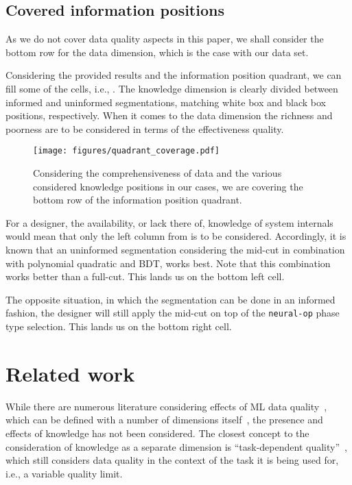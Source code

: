 \subsection{Covered information positions}
As we do not cover data quality aspects in this paper, we shall consider the bottom row for the data dimension, which is the case with our data set.

Considering the provided results and the information position quadrant, we can fill some of the cells, i.e., . The knowledge dimension is clearly divided between informed and uninformed segmentations, matching white box and black box positions, respectively. When it comes to the data dimension the richness and poorness are to be considered in terms of the effectiveness quality.
%
\begin{figure}[htbp]
	\centering
	\texttt{[image: figures/quadrant\_coverage.pdf]}
	\caption{Considering the comprehensiveness of data and the various considered knowledge positions in our cases, we are covering the bottom row of the information position quadrant.}
	\label{fig:quadrant_coverage}
\end{figure}

For a designer, the availability, or lack there of, knowledge of system internals would mean that only the left column from  is to be considered. Accordingly, it is known that an uninformed segmentation considering the mid-cut in combination with polynomial quadratic and BDT, works best. Note that this combination works better than a full-cut. This lands us on the bottom left cell.

The opposite situation, in which the segmentation can be done in an informed fashion, the designer will still apply the mid-cut on top of the \texttt{neural-op} phase type selection. This lands us on the bottom right cell.

\section{Related work}
\label{sec:related_work}
While there are numerous literature considering effects of ML data quality~\cite{Mohammed:2024:EDQM, Foroni:2021:EEED, Frenay:2014:CPLN, Li:2021:CSEI, Neutatz:2022:DCAW, Shah:2024:HDCD}, which can be defined with a number of dimensions itself~\cite{Mohammed:2024:EDQM}, the presence and effects of knowledge has not been considered. The closest concept to the consideration of knowledge as a separate dimension is \enquote{task-dependent quality}~\cite{Foroni:2021:EEED}, which still considers data quality in the context of the task it is being used for, i.e., a variable quality limit.

